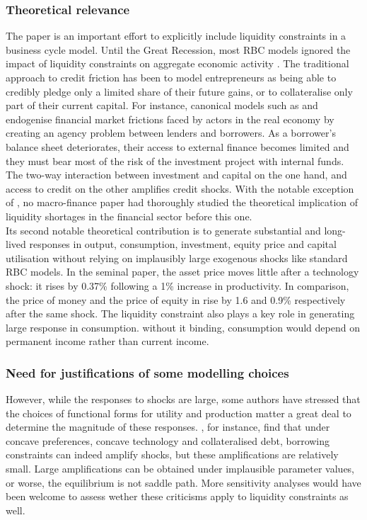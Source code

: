 \documentclass{amsart}
\theoremstyle{definition}
\theoremstyle{remark}
\numberwithin{equation}{section}
\begin{document}
\subsubsection*{Theoretical relevance} The paper is an important effort to explicitly include liquidity constraints in a business cycle model. Until the Great Recession, most RBC models ignored the impact of liquidity constraints on aggregate economic activity \citep{gertler2010financial}. The traditional approach to credit friction has been to model entrepreneurs as being able to credibly pledge only a limited share of their future gains, or to collateralise only part of their current capital. For instance, canonical models such as \cite{bernanke1989agency} and \cite{kiyotaki1997credit} endogenise financial market frictions faced by actors in the real economy by creating an agency problem between lenders and borrowers. As a borrower's balance sheet deteriorates, their access to external finance becomes limited and they must bear most of the risk of the investment project with internal funds. The two-way interaction between investment and capital on the one hand, and access to credit on the other amplifies credit shocks. With the notable exception of \cite{holmstrom1997financial}, no macro-finance paper had thoroughly studied the theoretical implication of liquidity shortages in the financial sector before this one.\\

Its second notable theoretical contribution is to generate substantial and long-lived responses in output, consumption, investment, equity price and capital utilisation without relying on implausibly large exogenous shocks like standard RBC models. In the seminal \cite{kiyotaki1997credit} paper, the asset price moves little after a technology shock: it rises by 0.37\% following a 1\% increase in productivity. In comparison, the price of money and the price of equity in \cite{kiyotaki2019liquidity} rise by 1.6 and 0.9\% respectively after the same shock. The liquidity constraint also plays a key role in generating large response in consumption. without it binding, consumption would depend on permanent income rather than current income.\\

\subsubsection*{Need for justifications of some modelling choices} However, while the responses to shocks are large, some authors have stressed that the choices of functional forms for utility and production matter a great deal to determine the magnitude of these responses. \cite{cordoba2004credit}, for instance, find that under concave preferences, concave technology and collateralised debt, borrowing constraints can indeed amplify shocks, but these amplifications are relatively small. Large amplifications can be obtained under implausible parameter values, or worse, the equilibrium is not saddle path. More sensitivity analyses would have been welcome to assess wether these criticisms apply to liquidity constraints as well.\\
\end{document}

